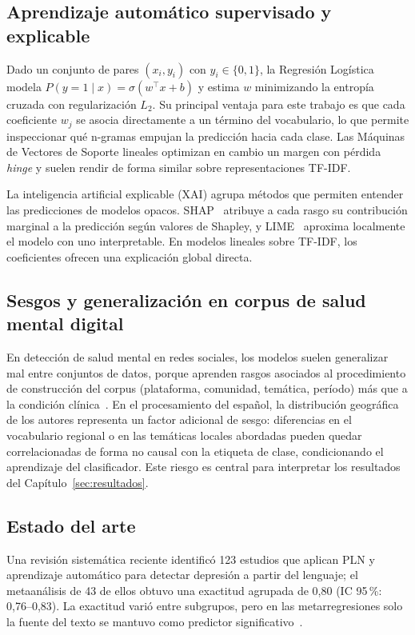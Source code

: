 \documentclass[12pt,a4paper]{article}
\begin{document}
\subsection{Aprendizaje automático supervisado y explicable}
Dado un conjunto de pares $(x_i, y_i)$ con $y_i \in \{0, 1\}$, la Regresión Logística modela $P(y=1\mid x) = \sigma(w^{\top}x + b)$ y estima $w$ minimizando la entropía cruzada con regularización $L_2$. Su principal ventaja para este trabajo es que cada coeficiente $w_j$ se asocia directamente a un término del vocabulario, lo que permite inspeccionar qué n-gramas empujan la predicción hacia cada clase. Las Máquinas de Vectores de Soporte lineales optimizan en cambio un margen con pérdida \emph{hinge} y suelen rendir de forma similar sobre representaciones TF-IDF.

La inteligencia artificial explicable (XAI) agrupa métodos que permiten entender las predicciones de modelos opacos. SHAP~\cite{lundberg2017shap} atribuye a cada rasgo su contribución marginal a la predicción según valores de Shapley, y LIME~\cite{ribeiro2016lime} aproxima localmente el modelo con uno interpretable. En modelos lineales sobre TF-IDF, los coeficientes ofrecen una explicación global directa.

\subsection{Sesgos y generalización en corpus de salud mental digital}
En detección de salud mental en redes sociales, los modelos suelen generalizar mal entre conjuntos de datos, porque aprenden rasgos asociados al procedimiento de construcción del corpus (plataforma, comunidad, temática, período) más que a la condición clínica~\cite{harrigian2020generalize}. En el procesamiento del español, la distribución geográfica de los autores representa un factor adicional de sesgo: diferencias en el vocabulario regional o en las temáticas locales abordadas pueden quedar correlacionadas de forma no causal con la etiqueta de clase, condicionando el aprendizaje del clasificador. Este riesgo es central para interpretar los resultados del Capítulo~\ref{sec:resultados}.

\subsection{Estado del arte}
Una revisión sistemática reciente identificó 123 estudios que aplican PLN y aprendizaje automático para detectar depresión a partir del lenguaje; el metaanálisis de 43 de ellos obtuvo una exactitud agrupada de 0{,}80 (IC 95\,\%: 0{,}76--0{,}83). La exactitud varió entre subgrupos, pero en las metarregresiones solo la fuente del texto se mantuvo como predictor significativo~\cite{fisher2025metaanalisis}.
\end{document}

